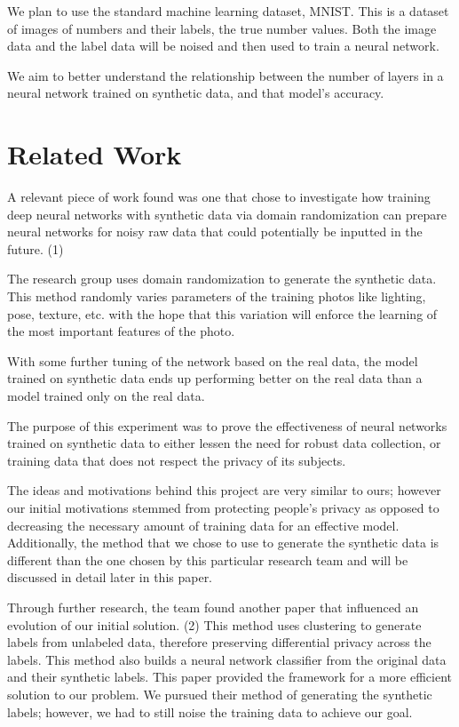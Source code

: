 \documentclass[12pt]{report}
\begin{document}
We plan to use the standard machine learning dataset, MNIST. This is a dataset of images of numbers and their labels, the true number values. Both the image data and the label data will be noised and then used to train a neural network. 

We aim to better understand the relationship between the number of layers in a neural network trained on synthetic data, and that model's accuracy.


\section{Related Work}

A relevant piece of work found was one that chose to investigate how training deep neural networks with synthetic data via domain randomization can prepare neural networks for noisy raw data that could potentially be inputted in the future. (1)

The research group uses domain randomization to generate the synthetic data. This method randomly varies parameters of the training photos like lighting, pose, texture, etc. with the hope that this variation will enforce the learning of the most important features of the photo. 

With some further tuning of the network based on the real data, the model trained on synthetic data ends up performing better on the real data than a model trained only on the real data. 

The purpose of this experiment was to prove the effectiveness of neural networks trained on synthetic data to either lessen the need for robust data collection, or training data that does not respect the privacy of its subjects.  

The ideas and motivations behind this project are very similar to ours; however our initial motivations stemmed from protecting people's privacy as opposed to decreasing the necessary amount of training data for an effective model. Additionally, the method that we chose to use to generate the synthetic data is different than the one chosen by this particular research team and will be discussed in detail later in this paper. 

Through further research, the team found another paper that influenced an evolution of our initial solution. (2) This method uses clustering to generate labels from unlabeled data, therefore preserving differential privacy across the labels. This method also builds a neural network classifier from the original data and their synthetic labels. This paper provided the framework for a more efficient solution to our problem. We pursued their method of generating the synthetic labels; however, we had to still noise the training data to achieve our goal.  
\end{document}
